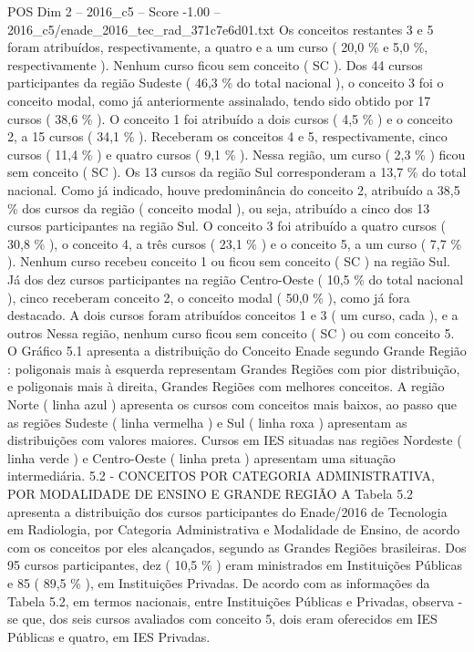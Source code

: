 \begin{textsample}{POS Dim 2 – 2016\_c5 – Score -1.00 – 2016\_c5/enade\_2016\_tec\_rad\_371c7e6d01.txt}
Os conceitos restantes 3 e 5 foram atribuídos, respectivamente, a quatro e a um curso ( 20,0 \% e 5,0 \%, respectivamente ).
Nenhum curso ficou sem conceito ( SC ).
Dos 44 cursos participantes da região Sudeste ( 46,3 \% do total nacional ), o conceito 3 foi o conceito modal, como já anteriormente assinalado, tendo sido obtido por 17 cursos ( 38,6 \% ).
O conceito 1 foi atribuído a dois cursos ( 4,5 \% ) e o conceito 2, a 15 cursos ( 34,1 \% ).
Receberam os conceitos 4 e 5, respectivamente, cinco cursos ( 11,4 \% ) e quatro cursos ( 9,1 \% ).
Nessa região, um curso ( 2,3 \% ) ficou sem conceito ( SC ).
Os 13 cursos da região Sul corresponderam a 13,7 \% do total nacional.
Como já indicado, houve predominância do conceito 2, atribuído a 38,5 \% dos cursos da região ( conceito modal ), ou seja, atribuído a cinco dos 13 cursos participantes na região Sul.
O conceito 3 foi atribuído a quatro cursos ( 30,8 \% ), o conceito 4, a três cursos ( 23,1 \% ) e o conceito 5, a um curso ( 7,7 \% ).
Nenhum curso recebeu conceito 1 ou ficou sem conceito ( SC ) na região Sul.
Já dos dez cursos participantes na região Centro-Oeste ( 10,5 \% do total nacional ), cinco receberam conceito 2, o conceito modal ( 50,0 \% ), como já fora destacado.
A dois cursos foram atribuídos conceitos 1 e 3 ( um curso, cada ), e a outros Nessa região, nenhum curso ficou sem conceito ( SC ) ou com conceito 5.
O Gráfico 5.1 apresenta a distribuição do Conceito Enade segundo Grande Região : poligonais mais à esquerda representam Grandes Regiões com pior distribuição, e poligonais mais à direita, Grandes Regiões com melhores conceitos.
A região Norte ( linha azul ) apresenta os cursos com conceitos mais baixos, ao passo que as regiões Sudeste ( linha vermelha ) e Sul ( linha roxa ) apresentam as distribuições com valores maiores.
Cursos em IES situadas nas regiões Nordeste ( linha verde ) e Centro-Oeste ( linha preta ) apresentam uma situação intermediária. 5.2 - CONCEITOS POR CATEGORIA ADMINISTRATIVA, POR MODALIDADE DE ENSINO E GRANDE REGIÃO A Tabela 5.2 apresenta a distribuição dos cursos participantes do Enade/2016 de Tecnologia em Radiologia, por Categoria Administrativa e Modalidade de Ensino, de acordo com os conceitos por eles alcançados, segundo as Grandes Regiões brasileiras.
Dos 95 cursos participantes, dez ( 10,5 \% ) eram ministrados em Instituições Públicas e 85 ( 89,5 \% ), em Instituições Privadas.
De acordo com as informações da Tabela 5.2, em termos nacionais, entre Instituições Públicas e Privadas, observa -se que, dos seis cursos avaliados com conceito 5, dois eram oferecidos em IES Públicas e quatro, em IES Privadas.

\end{textsample}
